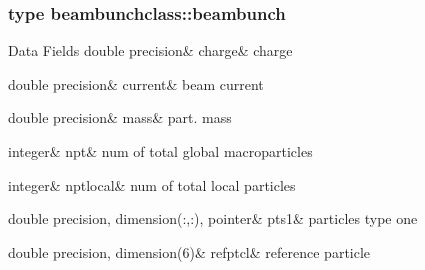 \subsubsection{type beambunchclass\+::beambunch}
\begin{DoxyFields}{Data Fields}
\mbox{\label{namespacebeambunchclass_a555bb0dc53871a3f69755125598c8938}} 
double precision&
charge&
charge \\
\hline

\mbox{\label{namespacebeambunchclass_a0611d8fb67f60eb1ea7a3df79c5de915}} 
double precision&
current&
beam current \\
\hline

\mbox{\label{namespacebeambunchclass_abeaad3b1ce823a9c49cab5a8b96f5ff0}} 
double precision&
mass&
part. mass \\
\hline

\mbox{\label{namespacebeambunchclass_a20f5303645e1b7fa0cbfa88f81cda947}} 
integer&
npt&
num of total global macroparticles \\
\hline

\mbox{\label{namespacebeambunchclass_a71a8687235fdc19d862fb13092b714a3}} 
integer&
nptlocal&
num of total local particles \\
\hline

\mbox{\label{namespacebeambunchclass_af0d19c1e3e537ade010af8554783c8d7}} 
double precision, dimension(:,:), pointer&
pts1&
particles type one \\
\hline

\mbox{\label{namespacebeambunchclass_a973e0e4ee1b24185bac1d727d2c074f5}} 
double precision, dimension(6)&
refptcl&
reference particle \\
\hline

\end{DoxyFields}
